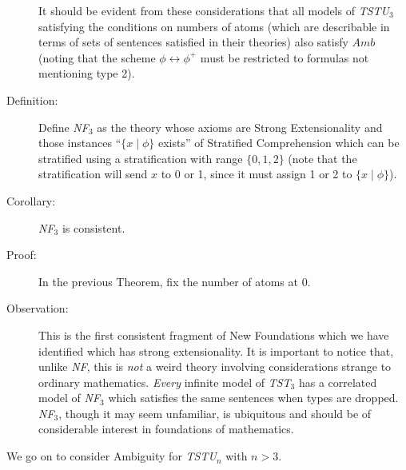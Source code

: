 \documentclass[12pt]{book}
\begin{document}
\begin{description}
It should be evident from these considerations that all models of {\em
TSTU$_3$\/} satisfying the conditions on numbers of atoms (which are
describable in terms of sets of sentences satisfied in their theories)
also satisfy $Amb$ (noting that the scheme $\phi \leftrightarrow
\phi^+$ must be restricted to formulas not mentioning type 2).

\item[Definition:] Define {\em NF$_3$\/} as the theory whose axioms
are Strong Extensionality and those instances ``$\{x \mid \phi\}$
exists'' of Stratified Comprehension which can be stratified using a
stratification with range $\{0,1,2\}$ (note that the stratification
will send $x$ to 0 or 1, since it must assign 1 or 2 to $\{x \mid
\phi\}$).

\item[Corollary:]  {\em NF$_3$\/} is consistent.


\item[Proof:]  In the previous Theorem, fix the number of atoms at 0.

\item[Observation:] This is the first consistent fragment of New
Foundations which we have identified which has strong extensionality.
It is important to notice that, unlike {\em NF\/}, this is {\em not\/}
a weird theory involving considerations strange to ordinary
mathematics.  {\em Every\/} infinite model of {\em TST$_3$\/} has a
correlated model of {\em NF$_3$\/} which satisfies the same sentences
when types are dropped.  {\em NF$_3$\/}, though it may seem
unfamiliar, is ubiquitous and should be of considerable interest in
foundations of mathematics.

\end{description}

We go on to consider Ambiguity for {\em TSTU\/}$_n$ with $n>3$.
\end{document}
